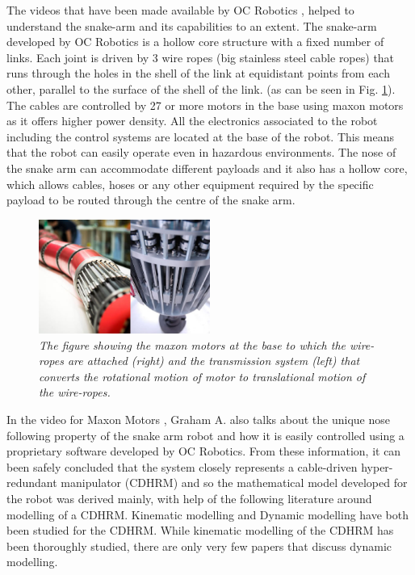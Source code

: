 \documentclass[a4paper,12pt]{report}
\begin{document}
The videos that have been made available by OC Robotics \cite{OCRobotics_videos_1, OCRobotics_videos_2, OCRobotics_videos_3, OCRobotics_videos_4}, helped to understand the snake-arm and its capabilities to an extent. The snake-arm developed by OC Robotics is a hollow core structure with a fixed number of links. Each joint is driven by 3 wire ropes (big stainless steel cable ropes) that runs through the holes in the shell of the link at equidistant points from each other, parallel to the surface of the shell of the link. \cite{OCRobotics_article} (as can be seen in Fig. \ref{base-pic}). The cables are controlled by 27 or more motors in the base \cite{OCRobotics_videos_2} using maxon motors as it offers higher power density. All the electronics associated to the robot including the control systems are located at the base of the robot. This means that the robot can easily operate even in hazardous environments. The nose of the snake arm can accommodate different payloads and it also has a hollow core, which allows cables, hoses or any other equipment required by the specific payload to be routed through the centre of the snake arm.
\begin{figure}
	\centering
	\includegraphics[width=0.5\textwidth]{images/maxon-motors.jpg}
	\caption{\textit{The figure showing the maxon motors at the base to which the wire-ropes are attached (right) and the transmission system (left) that converts the rotational motion of motor to translational motion of the wire-ropes. \cite{CNNarticle}}}
	\vspace{-15pt}
	\label{base-pic}
\end{figure}

In the video for Maxon Motors \cite{OCRobotics_videos_2}, Graham A. also talks about the unique nose following property of the snake arm robot and how it is easily controlled using a proprietary software developed by OC Robotics. 
From these information, it can been safely concluded that the system closely represents a cable-driven hyper-redundant manipulator (CDHRM) and so the mathematical model developed for the robot was derived mainly, with help of the following literature \cite{RN30, RN31, RN29} around modelling of a CDHRM. Kinematic modelling and Dynamic modelling have both been studied for the CDHRM. While kinematic modelling of the CDHRM has been thoroughly studied, there are only very few papers that discuss dynamic modelling.
\end{document}
